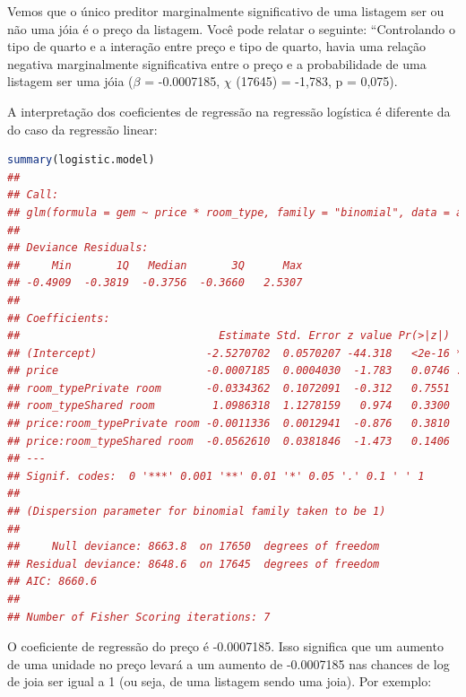 \documentclass{article}
\begin{document}
Vemos que o único preditor marginalmente significativo de uma listagem ser ou não uma jóia é o preço da listagem. Você pode relatar o seguinte: “Controlando o tipo de quarto e a interação entre preço e tipo de quarto, havia uma relação negativa marginalmente significativa entre o preço e a probabilidade de uma listagem ser uma jóia ($\beta$ = -0.0007185, $\chi$ (17645) = -1,783, p = 0,075). 

A interpretação dos coeficientes de regressão na regressão logística é diferente da do caso da regressão linear:

\begin{lstlisting}[language=R]
summary(logistic.model)
## 
## Call:
## glm(formula = gem ~ price * room_type, family = "binomial", data = airbnb)
## 
## Deviance Residuals: 
##     Min       1Q   Median       3Q      Max  
## -0.4909  -0.3819  -0.3756  -0.3660   2.5307  
## 
## Coefficients:
##                               Estimate Std. Error z value Pr(>|z|)    
## (Intercept)                 -2.5270702  0.0570207 -44.318   <2e-16 ***
## price                       -0.0007185  0.0004030  -1.783   0.0746 .  
## room_typePrivate room       -0.0334362  0.1072091  -0.312   0.7551    
## room_typeShared room         1.0986318  1.1278159   0.974   0.3300    
## price:room_typePrivate room -0.0011336  0.0012941  -0.876   0.3810    
## price:room_typeShared room  -0.0562610  0.0381846  -1.473   0.1406    
## ---
## Signif. codes:  0 '***' 0.001 '**' 0.01 '*' 0.05 '.' 0.1 ' ' 1
## 
## (Dispersion parameter for binomial family taken to be 1)
## 
##     Null deviance: 8663.8  on 17650  degrees of freedom
## Residual deviance: 8648.6  on 17645  degrees of freedom
## AIC: 8660.6
## 
## Number of Fisher Scoring iterations: 7

\end{lstlisting}

O coeficiente de regressão do preço é -0.0007185. Isso significa que um aumento de uma unidade no preço levará a um aumento de -0.0007185 nas chances de log de joia ser igual a 1 (ou seja, de uma listagem sendo uma joia). Por exemplo:
\end{document}
